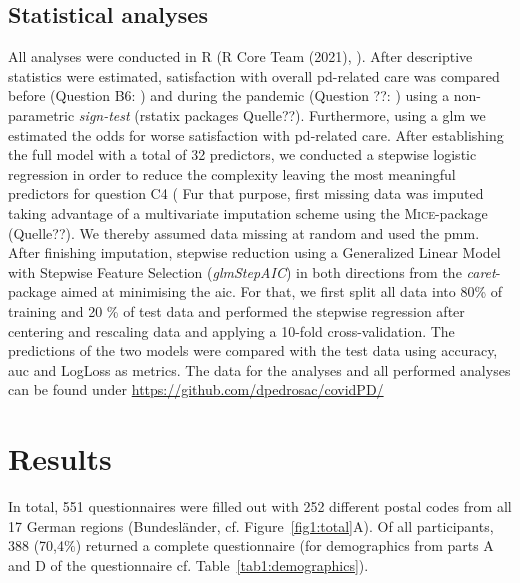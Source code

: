 \documentclass{bmcart}
\begin{document}
\subsection*{Statistical analyses}
All analyses were conducted in R (R Core Team (2021), \cite{rcore}). After descriptive statistics were estimated, satisfaction with overall \ac{pd}-related care was compared before (Question B6: ) and during the pandemic (Question ??: ) using a non-parametric \textit{sign-test} (rstatix packages Quelle??). Furthermore, using a \ac{glm} we estimated the odds for worse satisfaction with \ac{pd}-related care. After establishing the full model with a total of 32 predictors, we conducted a stepwise logistic regression in order to reduce the complexity leaving the most meaningful predictors for question C4 ( %
Fur that purpose, first missing data was imputed taking advantage of a multivariate imputation scheme using the \textsc{Mice}-package (Quelle??). We thereby assumed data missing at random and used the \ac{pmm}. After finishing imputation, stepwise reduction using a Generalized Linear Model with Stepwise Feature Selection (\textit{glmStepAIC}) in both directions from the \textit{caret}-package aimed at minimising the \ac{aic}. For that, we first split all data into 80\% of training and 20 \% of test data and performed the stepwise regression after centering and rescaling data and applying a 10-fold cross-validation. The predictions of the two models were compared with the test data using accuracy, \ac{auc} and LogLoss as metrics. The data for the analyses and all performed analyses can be found under \url{https://github.com/dpedrosac/covidPD/}

\section*{Results}
In total, 551 questionnaires were filled out with 252 different postal codes from all 17 German regions (Bundesländer, cf. Figure~\ref{fig1:total}A). Of all participants, 388 (70,4$\%$) returned a complete questionnaire (for demographics from parts A and D of the questionnaire cf. Table~\ref{tab1:demographics}). 
\end{document}
